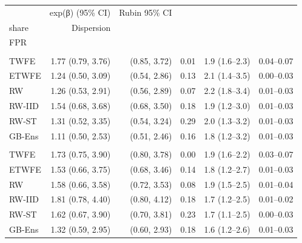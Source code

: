 \begin{table}
\fontsize{9.0pt}{11.0pt}\selectfont\setlength\tabcolsep{3.5pt}
\begin{tabular*}{1\linewidth}{@{\extracolsep{\fill}}lrrrrr}
\toprule
 & exp(β) (95\% CI) & Rubin 95\% CI & \begin{tabular}[b]{@{}r@{}}Between-draw\\share\end{tabular} & Dispersion & \begin{tabular}[b]{@{}r@{}}Placebo\\FPR\end{tabular} \\ 
\midrule\addlinespace[2.5pt]
\multicolumn{6}{l}{Unadjusted} \\[2.5pt] 
\midrule\addlinespace[2.5pt]
TWFE & 1.77 (0.79, 3.76) & (0.85, 3.72) & 0.01 & 1.9 (1.6–2.3) & 0.04–0.07 \\ 
ETWFE & 1.24 (0.50, 3.09) & (0.54, 2.86) & 0.13 & 2.1 (1.4–3.5) & 0.00–0.03 \\ 
RW & 1.26 (0.53, 2.91) & (0.56, 2.89) & 0.07 & 2.2 (1.8–3.4) & 0.01–0.03 \\ 
RW-IID & 1.54 (0.68, 3.68) & (0.68, 3.50) & 0.18 & 1.9 (1.2–3.0) & 0.01–0.03 \\ 
RW-ST & 1.31 (0.52, 3.35) & (0.54, 3.24) & 0.29 & 2.0 (1.3–3.2) & 0.01–0.03 \\ 
GB-Ens & 1.11 (0.50, 2.53) & (0.51, 2.46) & 0.16 & 1.8 (1.2–3.2) & 0.01–0.03 \\ 
\midrule\addlinespace[2.5pt]
\multicolumn{6}{l}{Adjusted for log population} \\[2.5pt] 
\midrule\addlinespace[2.5pt]
TWFE & 1.73 (0.75, 3.90) & (0.80, 3.78) & 0.00 & 1.9 (1.6–2.2) & 0.03–0.07 \\ 
ETWFE & 1.53 (0.66, 3.75) & (0.68, 3.46) & 0.14 & 1.8 (1.2–2.7) & 0.01–0.03 \\ 
RW & 1.58 (0.66, 3.58) & (0.72, 3.53) & 0.08 & 1.9 (1.5–2.5) & 0.01–0.04 \\ 
RW-IID & 1.81 (0.78, 4.40) & (0.80, 4.12) & 0.18 & 1.7 (1.2–2.5) & 0.01–0.02 \\ 
RW-ST & 1.62 (0.67, 3.90) & (0.70, 3.81) & 0.23 & 1.7 (1.1–2.5) & 0.00–0.03 \\ 
GB-Ens & 1.32 (0.59, 2.95) & (0.60, 2.93) & 0.18 & 1.6 (1.2–2.6) & 0.01–0.03 \\ 
\bottomrule
\end{tabular*}
\begin{minipage}{\linewidth}
\vspace{.05em}

\end{minipage}
\end{table}
